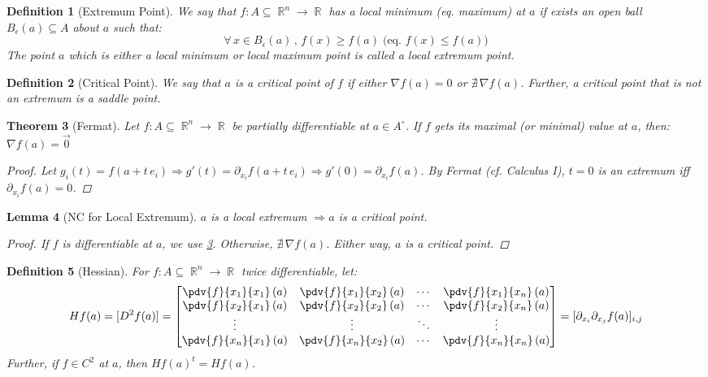 \documentclass[12pt]{article}
\let\RA\Rightarrow
\renewcommand{\grad}{\nabla}
\newcommand{\Forall}[1]{\forall\,{#1}\,,\,}
\DeclareMathOperator{\R}{\mathbb{R}}
\newtheorem{theorem}{Theorem}[subsection]
\newtheorem{definition}[theorem]{Definition}
\newtheorem{lemma}[theorem]{Lemma}
\begin{document}
\begin{definition}[Extremum Point]
  We say that $f:A\subseteq\R^n\to\R$ has a local minimum (eq. maximum) at $a$ if exists an open ball $B_\epsilon(a)\subseteq A$ about $a$ such that: $$\Forall{x\in B_\epsilon(a)} f(x)\geq f(a)\;\Big(\text{eq. }f(x)\leq f(a)\Big)$$ The point $a$ which is either a local minimum or local maximum point is called a local extremum point.
\end{definition}

\begin{definition}[Critical Point]
  We say that $a$ is a critical point of $f$ if either $\grad f(a)=0$ or $\nexists\,\grad f(a)$. Further, a critical point that is not an extremum is a saddle point.
\end{definition}

\begin{theorem}[Fermat]
  \label{fermat}
  Let $f:A\subseteq\R^n\to\R$ be partially differentiable at $a\in A^\circ$. If $f$ gets its maximal (or minimal) value at $a$, then: $\grad f(a)=\vec{0}$
  \begin{proof}
    Let $g_i(t)=f(a+t\,e_i)\RA g'(t)=\partial_{x_i} f(a+t\,e_i)\RA g'(0)=\partial_{x_i} f(a)$. By Fermat (cf. Calculus I), $t=0$ is an extremum iff $\partial_{x_i} f(a)=0$.
  \end{proof}
\end{theorem}

\begin{lemma}[NC for Local Extremum]
  $a$ is a local extremum $\RA a$ is a critical point.
  \begin{proof}
    If $f$ is differentiable at $a$, we use \ref{fermat}. Otherwise, $\nexists\,\grad f(a)$. Either way, $a$ is a critical point.
  \end{proof}
\end{lemma}

\begin{definition}[Hessian]
  For $f:A\subseteq\R^n\to\R$ twice differentiable, let: 
  $$Hf(a)=[D^2f(a)]=\begin{bmatrix}
    \pdv{f}{x_1}{x_1}\,(a)&\pdv{f}{x_1}{x_2}\,(a)&\cdots&\pdv{f}{x_1}{x_n}\,(a)\\
    \pdv{f}{x_2}{x_1}\,(a)&\pdv{f}{x_2}{x_2}\,(a)&\cdots&\pdv{f}{x_2}{x_n}\,(a)\\
    \vdots&\vdots&\ddots&\vdots\\
    \pdv{f}{x_n}{x_1}\,(a)&\pdv{f}{x_n}{x_2}\,(a)&\cdots&\pdv{f}{x_n}{x_n}\,(a)
  \end{bmatrix}=[\partial_{x_i}\partial_{x_j} f(a)]_{i,j}$$
  Further, if $f\in C^2$ at $a$, then $Hf(a)^t=Hf(a)$.
\end{definition}
\end{document}
